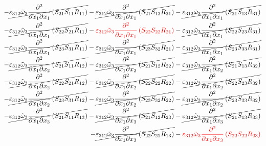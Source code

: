 \begin{equation}
	\begin{split}
		-\cancel{\varepsilon_{312}\tilde{\omega}_{3}\pdv{}{x_{1}}{x_{1}}\left(S_{21}S_{11}R_{11}\right)}
		-\cancel{\varepsilon_{312}\tilde{\omega}_{3}\pdv{}{x_{1}}{x_{1}}\left(S_{21}S_{12}R_{21}\right)}
		-\cancel{\varepsilon_{312}\tilde{\omega}_{3}\pdv{}{x_{1}}{x_{1}}\left(S_{21}S_{13}R_{31}\right)}\\
		-\cancel{\varepsilon_{312}\tilde{\omega}_{3}\pdv{}{x_{1}}{x_{1}}\left(S_{22}S_{21}R_{11}\right)}
		-{\color{red}\varepsilon_{312}\tilde{\omega}_{3}\pdv{}{x_{1}}{x_{1}}\left(S_{22}S_{22}R_{21}\right)}
		-\cancel{\varepsilon_{312}\tilde{\omega}_{3}\pdv{}{x_{1}}{x_{1}}\left(S_{22}S_{23}R_{31}\right)}\\
		-\cancel{\varepsilon_{312}\tilde{\omega}_{3}\pdv{}{x_{1}}{x_{1}}\left(S_{23}S_{31}R_{11}\right)}
		-\cancel{\varepsilon_{312}\tilde{\omega}_{3}\pdv{}{x_{1}}{x_{1}}\left(S_{23}S_{32}R_{21}\right)}
		-\cancel{\varepsilon_{312}\tilde{\omega}_{3}\pdv{}{x_{1}}{x_{1}}\left(S_{23}S_{33}R_{31}\right)}\\
		-\cancel{\varepsilon_{312}\tilde{\omega}_{3}\pdv{}{x_{1}}{x_{2}}\left(S_{21}S_{11}R_{12}\right)}
		-\cancel{\varepsilon_{312}\tilde{\omega}_{3}\pdv{}{x_{1}}{x_{2}}\left(S_{21}S_{12}R_{22}\right)}
		-\cancel{\varepsilon_{312}\tilde{\omega}_{3}\pdv{}{x_{1}}{x_{2}}\left(S_{21}S_{13}R_{32}\right)}\\
		-\cancel{\varepsilon_{312}\tilde{\omega}_{3}\pdv{}{x_{1}}{x_{2}}\left(S_{22}S_{21}R_{12}\right)}
		-\cancel{\varepsilon_{312}\tilde{\omega}_{3}\pdv{}{x_{1}}{x_{2}}\left(S_{22}S_{22}R_{22}\right)}
		-\cancel{\varepsilon_{312}\tilde{\omega}_{3}\pdv{}{x_{1}}{x_{2}}\left(S_{22}S_{23}R_{32}\right)}\\
		-\cancel{\varepsilon_{312}\tilde{\omega}_{3}\pdv{}{x_{1}}{x_{2}}\left(S_{23}S_{31}R_{12}\right)}
		-\cancel{\varepsilon_{312}\tilde{\omega}_{3}\pdv{}{x_{1}}{x_{2}}\left(S_{23}S_{32}R_{22}\right)}
		-\cancel{\varepsilon_{312}\tilde{\omega}_{3}\pdv{}{x_{1}}{x_{2}}\left(S_{23}S_{33}R_{32}\right)}\\
		-\cancel{\varepsilon_{312}\tilde{\omega}_{3}\pdv{}{x_{1}}{x_{3}}\left(S_{21}S_{11}R_{13}\right)}
		-\cancel{\varepsilon_{312}\tilde{\omega}_{3}\pdv{}{x_{1}}{x_{3}}\left(S_{21}S_{12}R_{23}\right)}
		-\cancel{\varepsilon_{312}\tilde{\omega}_{3}\pdv{}{x_{1}}{x_{3}}\left(S_{21}S_{13}R_{33}\right)}\\
		-\cancel{\varepsilon_{312}\tilde{\omega}_{3}\pdv{}{x_{1}}{x_{3}}\left(S_{22}S_{21}R_{13}\right)}
		-{\color{red}\varepsilon_{312}\tilde{\omega}_{3}\pdv{}{x_{1}}{x_{3}}\left(S_{22}S_{22}R_{23}\right)}

\end{split}
\end{equation}
